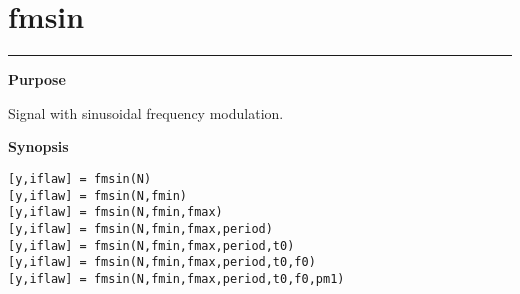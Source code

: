 


\section*{\hspace*{-1.6cm} fmsin}

\vspace*{-.4cm}
\hspace*{-1.6cm}\rule[0in]{16.5cm}{.02cm}
\vspace*{.2cm}



{\bf \large \sf Purpose}\\
\hspace*{1.5cm}
\begin{minipage}[t]{13.5cm}
Signal with sinusoidal frequency modulation.
\end{minipage}
\vspace*{.5cm}


{\bf \large \sf Synopsis}\\
\hspace*{1.5cm}
\begin{minipage}[t]{13.5cm}
\begin{verbatim}
[y,iflaw] = fmsin(N)
[y,iflaw] = fmsin(N,fmin)
[y,iflaw] = fmsin(N,fmin,fmax)
[y,iflaw] = fmsin(N,fmin,fmax,period)
[y,iflaw] = fmsin(N,fmin,fmax,period,t0)
[y,iflaw] = fmsin(N,fmin,fmax,period,t0,f0)
[y,iflaw] = fmsin(N,fmin,fmax,period,t0,f0,pm1)
\end{verbatim}
\end{minipage}
\vspace*{.5cm}


